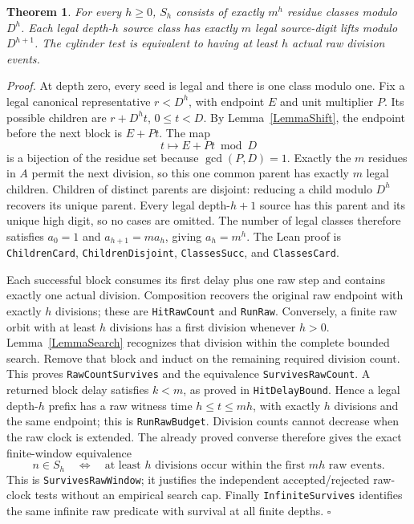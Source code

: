 \documentclass[11pt,letterpaper]{article}
\newtheorem{theorem}{Theorem}
\newenvironment{proof}{\noindent\textit{Proof.}}{\hfill\(\square\)}
\begin{document}
\begin{theorem}\label{TheoremCylinders}
For every \(h\ge0\), \(S_h\) consists of exactly \(m^h\) residue
classes modulo \(D^h\).
Each legal depth-\(h\) source class has exactly \(m\) legal source-digit
lifts modulo \(D^{h+1}\).
The cylinder test is equivalent to having at least \(h\) actual raw division events.
\end{theorem}
\begin{proof}
At depth zero, every seed is legal and there is one class modulo one.
Fix a legal canonical representative \(r<D^h\), with endpoint \(E\) and
unit multiplier \(P\).
Its possible children are \(r+D^ht\), \(0\le t<D\).
By Lemma~\ref{LemmaShift}, the endpoint before the next block is \(E+Pt\).
The map
\[
t\longmapsto E+Pt\bmod D
\]
is a bijection of the residue set because \(\gcd(P,D)=1\).
Exactly the \(m\) residues in \(A\) permit the next division,
so this one common parent has exactly \(m\) legal children.
Children of distinct parents are disjoint: reducing a child modulo \(D^h\)
recovers its unique parent. Every legal depth-\(h+1\) source has this parent
and its unique high digit, so no cases are omitted.
The number of legal classes therefore satisfies
\(a_0=1\) and \(a_{h+1}=ma_h\), giving \(a_h=m^h\).
The Lean proof is \texttt{ChildrenCard}, \texttt{ChildrenDisjoint},
\texttt{ClassesSucc}, and \texttt{ClassesCard}.

Each successful block consumes its first delay plus one raw step
and contains exactly one actual division.
Composition recovers the original raw endpoint with exactly \(h\)
divisions; these are \texttt{HitRawCount} and \texttt{RunRaw}.
Conversely, a finite raw orbit with at least \(h\) divisions has a first
division whenever \(h>0\).
Lemma~\ref{LemmaSearch} recognizes that division within the complete bounded search.
Remove that block and induct on the remaining required division count.
This proves \texttt{RawCountSurvives} and the equivalence
\texttt{SurvivesRawCount}.
A returned block delay satisfies \(k<m\), as proved in \texttt{HitDelayBound}.
Hence a legal depth-\(h\) prefix has a raw witness time \(h\le t\le mh\),
with exactly \(h\) divisions and the same endpoint; this is \texttt{RunRawBudget}.
Division counts cannot decrease when the raw clock is extended.
The already proved converse therefore gives the exact finite-window equivalence
\[
n\in S_h\quad\Longleftrightarrow\quad
\text{at least \(h\) divisions occur within the first \(mh\) raw events}.
\]
This is \texttt{SurvivesRawWindow}; it justifies the independent accepted/rejected
raw-clock tests without an empirical search cap.
Finally \texttt{InfiniteSurvives} identifies the same infinite raw predicate
with survival at all finite depths.
\end{proof}
\end{document}
